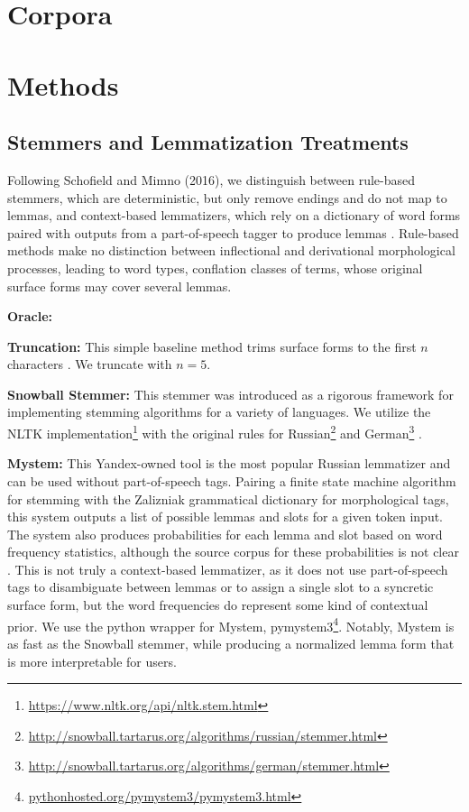 \documentclass[11pt,a4paper]{article}
\begin{document}
\section{Corpora}

\section{Methods}


\subsection{Stemmers and Lemmatization Treatments}
\label{sec:stemmers}
Following Schofield and Mimno (2016), we distinguish between rule-based stemmers, which are deterministic, but only remove endings and do not map to lemmas, and context-based lemmatizers, which rely on a dictionary of word forms paired with outputs from a part-of-speech tagger to produce lemmas \cite{schofield-mimno-2016-comparing,Sharoff2011ThePP}. Rule-based methods make no distinction between inflectional and derivational morphological processes, leading to word types, conflation classes of terms, whose original surface forms may cover several lemmas.

\textbf{Oracle:}

\textbf{Truncation:} This simple baseline method trims surface forms to the first $n$ characters \cite{schofield-mimno-2016-comparing}. We truncate with $n=5$.

\textbf{Snowball Stemmer:} This stemmer was introduced as a rigorous framework for implementing stemming algorithms for a variety of languages. We utilize the NLTK implementation\footnote{\url{https://www.nltk.org/api/nltk.stem.html}} with the original rules for Russian\footnote{\url{http://snowball.tartarus.org/algorithms/russian/stemmer.html}} and German\footnote{\url{http://snowball.tartarus.org/algorithms/german/stemmer.html}} \cite{snowball}.


\textbf{Mystem:} This Yandex-owned tool is the most popular Russian lemmatizer and can be used without part-of-speech tags. Pairing a finite state machine algorithm for stemming with the Zalizniak grammatical dictionary for morphological tags, this system outputs a list of possible lemmas and slots for a given token input. The system also produces probabilities for each lemma and slot based on word frequency statistics, although the source corpus for these probabilities is not clear \cite{Segalovich2003AFM}. This is not truly a context-based lemmatizer, as it does not use part-of-speech tags to disambiguate between lemmas or to assign a single slot to a syncretic surface form, but the word frequencies do represent some kind of contextual prior. We use the python wrapper for Mystem, pymystem3\footnote{\url{pythonhosted.org/pymystem3/pymystem3.html}}. Notably, Mystem is as fast as the Snowball stemmer, while producing a normalized lemma form that is more interpretable for users.
\end{document}
